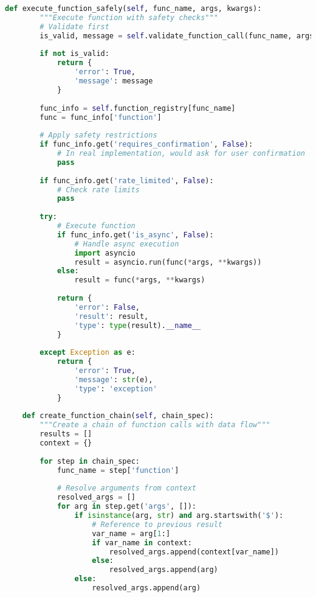 \begin{lstlisting}[language=Python, caption=Function calling token system]
    def execute_function_safely(self, func_name, args, kwargs):
        """Execute function with safety checks"""
        # Validate first
        is_valid, message = self.validate_function_call(func_name, args, kwargs)
        
        if not is_valid:
            return {
                'error': True,
                'message': message
            }
        
        func_info = self.function_registry[func_name]
        func = func_info['function']
        
        # Apply safety restrictions
        if func_info.get('requires_confirmation', False):
            # In real implementation, would ask for user confirmation
            pass
        
        if func_info.get('rate_limited', False):
            # Check rate limits
            pass
        
        try:
            # Execute function
            if func_info.get('is_async', False):
                # Handle async execution
                import asyncio
                result = asyncio.run(func(*args, **kwargs))
            else:
                result = func(*args, **kwargs)
            
            return {
                'error': False,
                'result': result,
                'type': type(result).__name__
            }
            
        except Exception as e:
            return {
                'error': True,
                'message': str(e),
                'type': 'exception'
            }
    
    def create_function_chain(self, chain_spec):
        """Create a chain of function calls with data flow"""
        results = []
        context = {}
        
        for step in chain_spec:
            func_name = step['function']
            
            # Resolve arguments from context
            resolved_args = []
            for arg in step.get('args', []):
                if isinstance(arg, str) and arg.startswith('$'):
                    # Reference to previous result
                    var_name = arg[1:]
                    if var_name in context:
                        resolved_args.append(context[var_name])
                    else:
                        resolved_args.append(arg)
                else:
                    resolved_args.append(arg)
            

\end{lstlisting}
